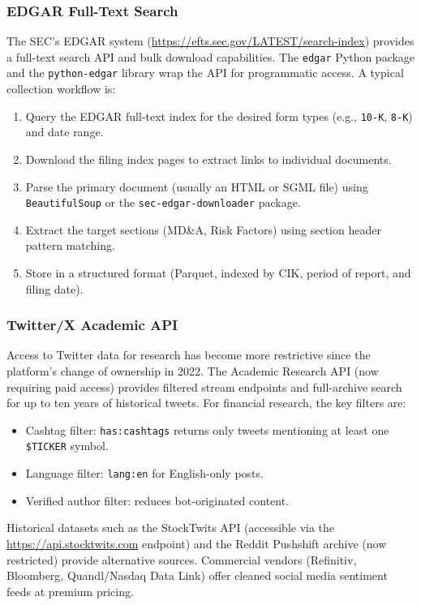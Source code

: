 \subsubsection*{EDGAR Full-Text Search}

The SEC's EDGAR system (\url{https://efts.sec.gov/LATEST/search-index}) provides a full-text search API and bulk download capabilities. The \texttt{edgar} Python package and the \texttt{python-edgar} library wrap the API for programmatic access. A typical collection workflow is:

\begin{enumerate}
  \item Query the EDGAR full-text index for the desired form types (e.g., \texttt{10-K}, \texttt{8-K}) and date range.
  \item Download the filing index pages to extract links to individual documents.
  \item Parse the primary document (usually an HTML or SGML file) using \texttt{BeautifulSoup} or the \texttt{sec-edgar-downloader} package.
  \item Extract the target sections (MD\&A, Risk Factors) using section header pattern matching.
  \item Store in a structured format (Parquet, indexed by CIK, period of report, and filing date).
\end{enumerate}

\subsubsection*{Twitter/X Academic API}

Access to Twitter data for research has become more restrictive since the platform's change of ownership in 2022. The Academic Research API (now requiring paid access) provides filtered stream endpoints and full-archive search for up to ten years of historical tweets. For financial research, the key filters are:
\begin{itemize}
  \item Cashtag filter: \texttt{has:cashtags} returns only tweets mentioning at least one \texttt{\$TICKER} symbol.
  \item Language filter: \texttt{lang:en} for English-only posts.
  \item Verified author filter: reduces bot-originated content.
\end{itemize}

Historical datasets such as the StockTwits API (accessible via the \url{https://api.stocktwits.com} endpoint) and the Reddit Pushshift archive (now restricted) provide alternative sources. Commercial vendors (Refinitiv, Bloomberg, Quandl/Nasdaq Data Link) offer cleaned social media sentiment feeds at premium pricing.

